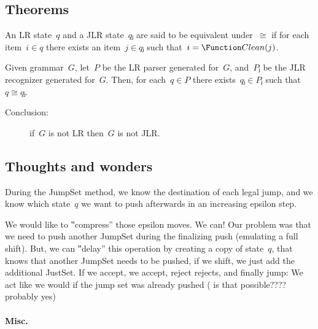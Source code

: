 \subsection{Theorems}
\begin{Definition}
  An LR state~$q$ and a JLR state~$qⱼ$ are said to be equivalent under~$≅$
    if for each item~$i∈q$ there exists an item~$j∈ qⱼ$ such that~$i = \Function
  Clean(j)$.
\end{Definition}

\begin{Lemma}
  Given grammar~$G$, let~$P$ be the LR parser generated for~$G$, and~$Pⱼ$ be
    the JLR recognizer generated for~$G$.
  Then, for each~$q∈P$ there exists~$qⱼ∈Pⱼ$ such that~$q≅qⱼ$.
\end{Lemma}
\begin{description}
  \item[Conclusion:] if~$G$ is not LR then~$G$ is not JLR.
\end{description}

\subsection{Thoughts and wonders}

During the JumpSet method, we know the destination of each legal jump,
and we know which state~$q$ we want to push afterwards in an increasing epsilon step.

We would like to ‟compress” those epsilon moves. We can!
Our problem was that we need to push another JumpSet during the finalizing push (emulating a full shift).
But, we can ‟delay” this operation by creating a copy of state~$q$, that knows that another JumpSet needs to be
pushed, if we shift, we just add the additional JustSet. If we accept, we accept, reject rejects, and finally jump:
We act like we would if the jump set was already pushed ( is that possible???? probably yes)
\paragraph{Misc.}

\endinput

\subsection{Between LR and JLR - A direct approach}
LR parsers are actually DPDAs\@. As we mentioned before in \cref{Section:proof},~$ε$-moves
  fails the emulation of a DPDA, thus, in order to type-encode an LR parser, we first need
  to convert it to the encode-able jDPDA\@.

